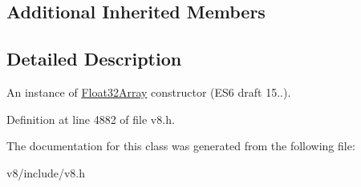 \subsection*{Additional Inherited Members}


\subsection{Detailed Description}
An instance of \mbox{\hyperlink{classv8_1_1Float32Array}{Float32\+Array}} constructor (E\+S6 draft 15..). 

Definition at line 4882 of file v8.\+h.



The documentation for this class was generated from the following file\+:\begin{DoxyCompactItemize}
\item 
v8/include/v8.\+h\end{DoxyCompactItemize}
